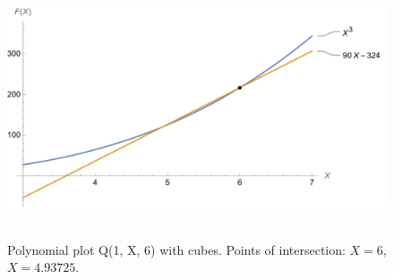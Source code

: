 ﻿\begin{figure}[H]
    \centering
    \includegraphics[width=1\textwidth]{sections/images/02_plots_polynomial_q1_n6_with_cubes}
    ~\caption{Polynomial plot Q(1, X, 6) with cubes.
    Points of intersection: $X=6$, $X=4.93725$.}\label{fig:figure8}
\end{figure}
